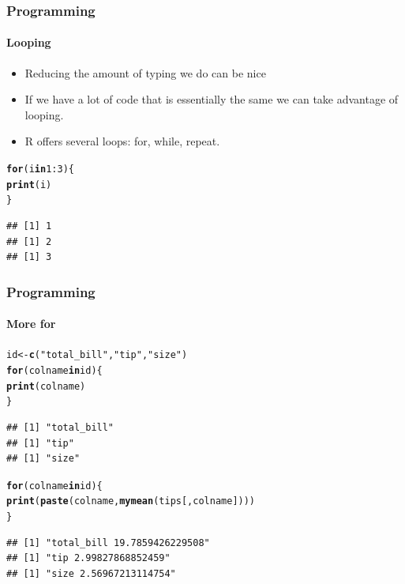 \documentclass[10pt]{beamer}\usepackage[]{graphicx}\usepackage[]{color}
\makeatletter
\newcommand{\hlnum}[1]{\textcolor[rgb]{0.686,0.059,0.569}{#1}}%
\newcommand{\hlstr}[1]{\textcolor[rgb]{0.192,0.494,0.8}{#1}}%
\newcommand{\hlopt}[1]{\textcolor[rgb]{0,0,0}{#1}}%
\newcommand{\hlstd}[1]{\textcolor[rgb]{0.345,0.345,0.345}{#1}}%
\newcommand{\hlkwa}[1]{\textcolor[rgb]{0.161,0.373,0.58}{\textbf{#1}}}%
\newcommand{\hlkwb}[1]{\textcolor[rgb]{0.69,0.353,0.396}{#1}}%
\newcommand{\hlkwd}[1]{\textcolor[rgb]{0.737,0.353,0.396}{\textbf{#1}}}%
\newenvironment{kframe}{%
 \def\at@end@of@kframe{}%
 \ifinner\ifhmode%
  \def\at@end@of@kframe{\end{minipage}}%
  \begin{minipage}{\columnwidth}%
 \fi\fi%
 \def\FrameCommand##1{\hskip\@totalleftmargin \hskip-\fboxsep
 \colorbox{shadecolor}{##1}\hskip-\fboxsep
     \hskip-\linewidth \hskip-\@totalleftmargin \hskip\columnwidth}%
 \MakeFramed {\advance\hsize-\width
   \@totalleftmargin\z@ \linewidth\hsize
   \@setminipage}}%
 {\par\unskip\endMakeFramed%
 \at@end@of@kframe}
\newenvironment{knitrout}{}{} %
\makeatother
\begin{document}
\begin{frame}[fragile]
    \frametitle{Programming}
    \framesubtitle{Looping}
    \begin{itemize}
        \item Reducing the amount of typing we do can be nice
        \item If we have a lot of code that is essentially the same we can take advantage of looping.
        \item R offers several loops: for, while, repeat.

    \end{itemize}
\begin{knitrout}\footnotesize
{}\color{fgcolor}\begin{kframe}
\begin{alltt}
\hlkwa{for} \hlstd{(i} \hlkwa{in} \hlnum{1}\hlopt{:}\hlnum{3}\hlstd{) \{}
    \hlkwd{print}\hlstd{(i)}
\hlstd{\}}
\end{alltt}
\begin{verbatim}
## [1] 1
## [1] 2
## [1] 3
\end{verbatim}
\end{kframe}
\end{knitrout}

\end{frame}

\begin{frame}[fragile]
    \frametitle{Programming}
    \framesubtitle{More for}


\begin{knitrout}\footnotesize
{}\color{fgcolor}\begin{kframe}
\begin{alltt}
\hlstd{id} \hlkwb{<-} \hlkwd{c}\hlstd{(}\hlstr{"total_bill"}\hlstd{,} \hlstr{"tip"}\hlstd{,} \hlstr{"size"}\hlstd{)}
\hlkwa{for} \hlstd{(colname} \hlkwa{in} \hlstd{id) \{}
    \hlkwd{print}\hlstd{(colname)}
\hlstd{\}}
\end{alltt}
\begin{verbatim}
## [1] "total_bill"
## [1] "tip"
## [1] "size"
\end{verbatim}
\begin{alltt}
\hlkwa{for} \hlstd{(colname} \hlkwa{in} \hlstd{id) \{}
    \hlkwd{print}\hlstd{(}\hlkwd{paste}\hlstd{(colname,} \hlkwd{mymean}\hlstd{(tips[, colname])))}
\hlstd{\}}
\end{alltt}
\begin{verbatim}
## [1] "total_bill 19.7859426229508"
## [1] "tip 2.99827868852459"
## [1] "size 2.56967213114754"
\end{verbatim}
\end{kframe}
\end{knitrout}

\end{frame}
\end{document}
